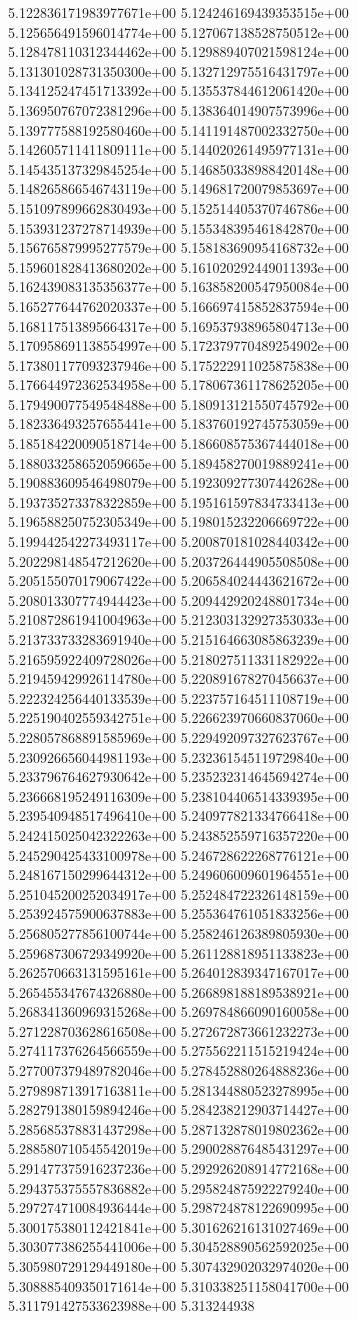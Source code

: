 5.122836171983977671e+00	5.124246169439353515e+00	5.125656491596014774e+00	5.127067138528750512e+00	5.128478110312344462e+00	5.129889407021598124e+00	5.131301028731350300e+00	5.132712975516431797e+00	5.134125247451713392e+00	5.135537844612061420e+00	5.136950767072381296e+00	5.138364014907573996e+00	5.139777588192580460e+00	5.141191487002332750e+00	5.142605711411809111e+00	5.144020261495977131e+00	5.145435137329845254e+00	5.146850338988420148e+00	5.148265866546743119e+00	5.149681720079853697e+00	5.151097899662830493e+00	5.152514405370746786e+00	5.153931237278714939e+00	5.155348395461842870e+00	5.156765879995277579e+00	5.158183690954168732e+00	5.159601828413680202e+00	5.161020292449011393e+00	5.162439083135356377e+00	5.163858200547950084e+00	5.165277644762020337e+00	5.166697415852837594e+00	5.168117513895664317e+00	5.169537938965804713e+00	5.170958691138554997e+00	5.172379770489254902e+00	5.173801177093237946e+00	5.175222911025875838e+00	5.176644972362534958e+00	5.178067361178625205e+00	5.179490077549548488e+00	5.180913121550745792e+00	5.182336493257655441e+00	5.183760192745753059e+00	5.185184220090518714e+00	5.186608575367444018e+00	5.188033258652059665e+00	5.189458270019889241e+00	5.190883609546498079e+00	5.192309277307442628e+00	5.193735273378322859e+00	5.195161597834733413e+00	5.196588250752305349e+00	5.198015232206669722e+00	5.199442542273493117e+00	5.200870181028440342e+00	5.202298148547212620e+00	5.203726444905508508e+00	5.205155070179067422e+00	5.206584024443621672e+00	5.208013307774944423e+00	5.209442920248801734e+00	5.210872861941004963e+00	5.212303132927353033e+00	5.213733733283691940e+00	5.215164663085863239e+00	5.216595922409728026e+00	5.218027511331182922e+00	5.219459429926114780e+00	5.220891678270456637e+00	5.222324256440133539e+00	5.223757164511108719e+00	5.225190402559342751e+00	5.226623970660837060e+00	5.228057868891585969e+00	5.229492097327623767e+00	5.230926656044981193e+00	5.232361545119729840e+00	5.233796764627930642e+00	5.235232314645694274e+00	5.236668195249116309e+00	5.238104406514339395e+00	5.239540948517496410e+00	5.240977821334766418e+00	5.242415025042322263e+00	5.243852559716357220e+00	5.245290425433100978e+00	5.246728622268776121e+00	5.248167150299644312e+00	5.249606009601964551e+00	5.251045200252034917e+00	5.252484722326148159e+00	5.253924575900637883e+00	5.255364761051833256e+00	5.256805277856100744e+00	5.258246126389805930e+00	5.259687306729349920e+00	5.261128818951133823e+00	5.262570663131595161e+00	5.264012839347167017e+00	5.265455347674326880e+00	5.266898188189538921e+00	5.268341360969315268e+00	5.269784866090160058e+00	5.271228703628616508e+00	5.272672873661232273e+00	5.274117376264566559e+00	5.275562211515219424e+00	5.277007379489782046e+00	5.278452880264888236e+00	5.279898713917163811e+00	5.281344880523278995e+00	5.282791380159894246e+00	5.284238212903714427e+00	5.285685378831437298e+00	5.287132878019802362e+00	5.288580710545542019e+00	5.290028876485431297e+00	5.291477375916237236e+00	5.292926208914772168e+00	5.294375375557836882e+00	5.295824875922279240e+00	5.297274710084936444e+00	5.298724878122690995e+00	5.300175380112421841e+00	5.301626216131027469e+00	5.303077386255441006e+00	5.304528890562592025e+00	5.305980729129449180e+00	5.307432902032974020e+00	5.308885409350171614e+00	5.310338251158041700e+00	5.311791427533623988e+00	5.313244938